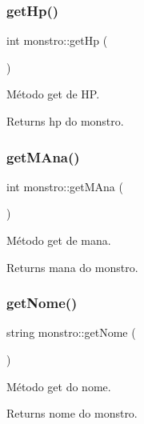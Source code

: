 \subsubsection{\texorpdfstring{get\+Hp()}{getHp()}}
{\footnotesize\ttfamily int monstro\+::get\+Hp (\begin{DoxyParamCaption}{ }\end{DoxyParamCaption})}



Método get de HP. 

\begin{DoxyReturn}{Returns}
hp do monstro. 
\end{DoxyReturn}
\mbox{\label{classmonstro_abf4c7159c0370eef7ee5c1992f475746}} 
\subsubsection{\texorpdfstring{get\+M\+Ana()}{getMAna()}}
{\footnotesize\ttfamily int monstro\+::get\+M\+Ana (\begin{DoxyParamCaption}{ }\end{DoxyParamCaption})}



Método get de mana. 

\begin{DoxyReturn}{Returns}
mana do monstro. 
\end{DoxyReturn}
\mbox{\label{classmonstro_a5b70fbe99ed64823246664deec8d4d6c}} 
\subsubsection{\texorpdfstring{get\+Nome()}{getNome()}}
{\footnotesize\ttfamily string monstro\+::get\+Nome (\begin{DoxyParamCaption}{ }\end{DoxyParamCaption})}



Método get do nome. 

\begin{DoxyReturn}{Returns}
nome do monstro. 
\end{DoxyReturn}
\mbox{\label{classmonstro_ab7a3d4c7f9ca3e5f56e27c5a1716d70f}} 
